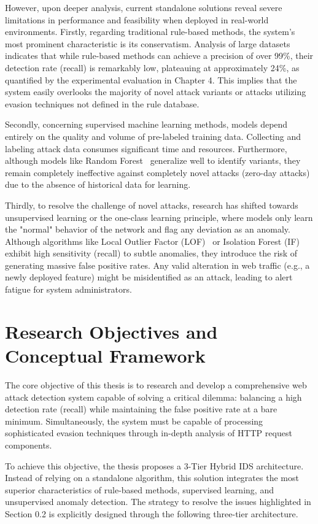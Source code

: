 \documentclass[../main.tex]{subfiles}
\begin{document}
However, upon deeper analysis, current standalone solutions reveal severe limitations in performance and feasibility when deployed in real-world environments. Firstly, regarding traditional rule-based methods, the system's most prominent characteristic is its conservatism. Analysis of large datasets indicates that while rule-based methods can achieve a precision of over 99\%, their detection rate (recall) is remarkably low, plateauing at approximately 24\%, as quantified by the experimental evaluation in Chapter 4. This implies that the system easily overlooks the majority of novel attack variants or attacks utilizing evasion techniques not defined in the rule database.

Secondly, concerning supervised machine learning methods, models depend entirely on the quality and volume of pre-labeled training data. Collecting and labeling attack data consumes significant time and resources. Furthermore, although models like Random Forest~\cite{breiman2001} generalize well to identify variants, they remain completely ineffective against completely novel attacks (zero-day attacks) due to the absence of historical data for learning.

Thirdly, to resolve the challenge of novel attacks, research has shifted towards unsupervised learning or the one-class learning principle, where models only learn the "normal" behavior of the network and flag any deviation as an anomaly. Although algorithms like Local Outlier Factor (LOF)~\cite{breunig2000} or Isolation Forest (IF)~\cite{liu2008} exhibit high sensitivity (recall) to subtle anomalies, they introduce the risk of generating massive false positive rates. Any valid alteration in web traffic (e.g., a newly deployed feature) might be misidentified as an attack, leading to alert fatigue for system administrators.

\section{Research Objectives and Conceptual Framework}
The core objective of this thesis is to research and develop a comprehensive web attack detection system capable of solving a critical dilemma: balancing a high detection rate (recall) while maintaining the false positive rate at a bare minimum. Simultaneously, the system must be capable of processing sophisticated evasion techniques through in-depth analysis of HTTP request components.

To achieve this objective, the thesis proposes a 3-Tier Hybrid IDS architecture. Instead of relying on a standalone algorithm, this solution integrates the most superior characteristics of rule-based methods, supervised learning, and unsupervised anomaly detection. The strategy to resolve the issues highlighted in Section 0.2 is explicitly designed through the following three-tier architecture.
\end{document}
